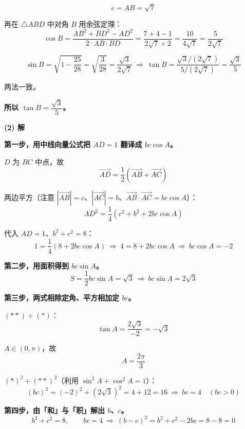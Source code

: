 \begin{answer}
\nopagebreak[4]
\[c=AB=\sqrt7\]

再在 $\triangle ABD$ 中对角 $B$ 用余弦定理：
\nopagebreak[4]
\[\cos B=\frac{AB^{2}+BD^{2}-AD^{2}}{2\cdot AB\cdot BD}=\frac{7+4-1}{2\sqrt7\times2}=\frac{10}{4\sqrt7}=\frac5{2\sqrt7}\]

\nopagebreak[4]
\[\sin B=\sqrt{1-\frac{25}{28}}=\sqrt{\frac3{28}}=\frac{\sqrt3}{2\sqrt7}\ \Longrightarrow\ \tan B=\frac{\sqrt3/\left(2\sqrt7\right)}{5/\left(2\sqrt7\right)}=\frac{\sqrt3}5\]

两法一致。

\textbf{所以 $\tan B=\dfrac{\sqrt3}5$。}

\par\medskip

\textbf{(2) 解}

\textbf{第一步，用中线向量公式把 $AD=1$ 翻译成 $bc\cos A$。}

$D$ 为 $BC$ 中点，故
\nopagebreak[4]
\[\overrightarrow{AD}=\frac12\left(\overrightarrow{AB}+\overrightarrow{AC}\right)\]

两边平方（注意 $\left|\overrightarrow{AB}\right|=c$、$\left|\overrightarrow{AC}\right|=b$、$\overrightarrow{AB}\cdot\overrightarrow{AC}=bc\cos A$）：
\nopagebreak[4]
\[AD^{2}=\frac14\left(c^{2}+b^{2}+2bc\cos A\right)\]

代入 $AD=1$、$b^{2}+c^{2}=8$：
\nopagebreak[4]
\[1=\frac14\left(8+2bc\cos A\right)\ \Longrightarrow\ 4=8+2bc\cos A\ \Longrightarrow\ bc\cos A=-2\tag{$*$}\]

\textbf{第二步，用面积得到 $bc\sin A$。}
\nopagebreak[4]
\[S=\frac12bc\sin A=\sqrt3\ \Longrightarrow\ bc\sin A=2\sqrt3\tag{$**$}\]

\textbf{第三步，两式相除定角、平方相加定 $bc$。}

$(\ast\ast)\div(\ast)$：
\nopagebreak[4]
\[\tan A=\frac{2\sqrt3}{-2}=-\sqrt3\]

$A\in(0,\pi)$，故
\nopagebreak[4]
\[A=\frac{2\pi}3\]

$(\ast)^{2}+(\ast\ast)^{2}$（利用 $\sin^{2}A+\cos^{2}A=1$）：
\nopagebreak[4]
\[(bc)^{2}=(-2)^{2}+\left(2\sqrt3\right)^{2}=4+12=16\ \Longrightarrow\ bc=4\quad(bc>0)\]

\textbf{第四步，由「和」与「积」解出 $b$、$c$。}
\nopagebreak[4]
\[b^{2}+c^{2}=8,\qquad bc=4\ \Longrightarrow\ (b-c)^{2}=b^{2}+c^{2}-2bc=8-8=0\]


\end{answer}
